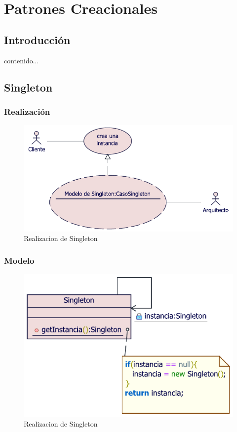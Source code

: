 \chapter{Patrones Creacionales}
\section{Introducción}
contenido...
\newpage

\section{Singleton}

\subsection{Realización}
\begin{figure}[h!]
	\centering
	\includegraphics[width=0.7\linewidth]{PATRONES/imgs/MRSingleton}
	\caption{Realizacion de Singleton}
	\label{fig:mrsingleton}
\end{figure}

\subsection{Modelo}
\begin{figure}[h!]
	\centering
	\includegraphics[width=0.7\linewidth]{PATRONES/imgs/MCSingleton}
	\caption{Realizacion de Singleton}
	\label{fig:mrsingleton}
\end{figure}
